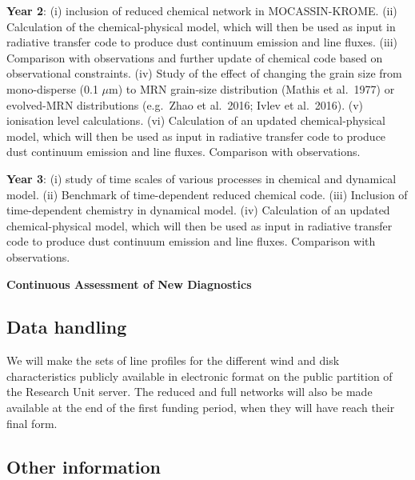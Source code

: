\documentclass[10pt,fleqn,twoside]{article}
\begin{document}
{\Tcol\bf Year 2}: (i) inclusion of reduced chemical network in MOCASSIN-KROME. (ii) Calculation of the chemical-physical model, which will then be used as input in radiative transfer code to produce dust continuum emission and line fluxes. (iii) Comparison with observations and further update of chemical code based on observational constraints. (iv) Study of the effect of changing the grain size from mono-disperse (0.1 $\mu$m) to MRN grain-size distribution (Mathis et al.\ 1977) or evolved-MRN distributions (e.g.\ Zhao et al.\ 2016; Ivlev et al.\ 2016). (v) ionisation level calculations. (vi)  Calculation of an updated chemical-physical model, which will then be used as input in radiative transfer code to produce dust continuum emission and line fluxes. Comparison with observations.

{\Tcol\bf Year 3}: (i) study of time scales of various processes in chemical and dynamical model. (ii) Benchmark of time-dependent reduced chemical code. (iii) Inclusion of time-dependent chemistry in dynamical model. (iv)  Calculation of an updated chemical-physical model, which will then be used as input in radiative transfer code to produce dust continuum emission and line fluxes. Comparison with observations.

{\Tcol\bf Continuous Assessment of New Diagnostics} 


\subsection{Data handling}
We will make the sets of line profiles for the different wind and disk characteristics publicly available in electronic format on the public partition of the Research Unit server. The reduced and full networks will also be made available at the end of the first funding period, when they will have reach their final form. 

\subsection{Other information}
\end{document}
